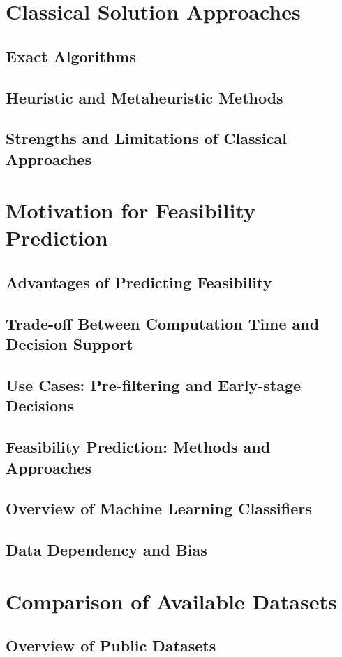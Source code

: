 
\chapter{Classical Solution Approaches}
\section{Exact Algorithms}
\section{Heuristic and Metaheuristic Methods}
\section{Strengths and Limitations of Classical Approaches}

\chapter{Motivation for Feasibility Prediction}
\section{Advantages of Predicting Feasibility}
\section{Trade-off Between Computation Time and Decision Support}
\section{Use Cases: Pre-filtering and Early-stage Decisions}
\section{Feasibility Prediction: Methods and Approaches}
\section{Overview of Machine Learning Classifiers}
\section{Data Dependency and Bias}

\chapter{Comparison of Available Datasets}
\section{Overview of Public Datasets}

